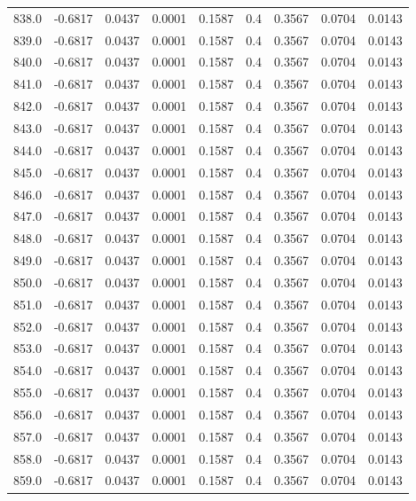 \begin{longtable}{lrrrrrrrr}
838.0 & -0.6817 & 0.0437 & 0.0001 & 0.1587 & 0.4 & 0.3567 & 0.0704 & 0.0143 \\
839.0 & -0.6817 & 0.0437 & 0.0001 & 0.1587 & 0.4 & 0.3567 & 0.0704 & 0.0143 \\
840.0 & -0.6817 & 0.0437 & 0.0001 & 0.1587 & 0.4 & 0.3567 & 0.0704 & 0.0143 \\
841.0 & -0.6817 & 0.0437 & 0.0001 & 0.1587 & 0.4 & 0.3567 & 0.0704 & 0.0143 \\
842.0 & -0.6817 & 0.0437 & 0.0001 & 0.1587 & 0.4 & 0.3567 & 0.0704 & 0.0143 \\
843.0 & -0.6817 & 0.0437 & 0.0001 & 0.1587 & 0.4 & 0.3567 & 0.0704 & 0.0143 \\
844.0 & -0.6817 & 0.0437 & 0.0001 & 0.1587 & 0.4 & 0.3567 & 0.0704 & 0.0143 \\
845.0 & -0.6817 & 0.0437 & 0.0001 & 0.1587 & 0.4 & 0.3567 & 0.0704 & 0.0143 \\
846.0 & -0.6817 & 0.0437 & 0.0001 & 0.1587 & 0.4 & 0.3567 & 0.0704 & 0.0143 \\
847.0 & -0.6817 & 0.0437 & 0.0001 & 0.1587 & 0.4 & 0.3567 & 0.0704 & 0.0143 \\
848.0 & -0.6817 & 0.0437 & 0.0001 & 0.1587 & 0.4 & 0.3567 & 0.0704 & 0.0143 \\
849.0 & -0.6817 & 0.0437 & 0.0001 & 0.1587 & 0.4 & 0.3567 & 0.0704 & 0.0143 \\
850.0 & -0.6817 & 0.0437 & 0.0001 & 0.1587 & 0.4 & 0.3567 & 0.0704 & 0.0143 \\
851.0 & -0.6817 & 0.0437 & 0.0001 & 0.1587 & 0.4 & 0.3567 & 0.0704 & 0.0143 \\
852.0 & -0.6817 & 0.0437 & 0.0001 & 0.1587 & 0.4 & 0.3567 & 0.0704 & 0.0143 \\
853.0 & -0.6817 & 0.0437 & 0.0001 & 0.1587 & 0.4 & 0.3567 & 0.0704 & 0.0143 \\
854.0 & -0.6817 & 0.0437 & 0.0001 & 0.1587 & 0.4 & 0.3567 & 0.0704 & 0.0143 \\
855.0 & -0.6817 & 0.0437 & 0.0001 & 0.1587 & 0.4 & 0.3567 & 0.0704 & 0.0143 \\
856.0 & -0.6817 & 0.0437 & 0.0001 & 0.1587 & 0.4 & 0.3567 & 0.0704 & 0.0143 \\
857.0 & -0.6817 & 0.0437 & 0.0001 & 0.1587 & 0.4 & 0.3567 & 0.0704 & 0.0143 \\
858.0 & -0.6817 & 0.0437 & 0.0001 & 0.1587 & 0.4 & 0.3567 & 0.0704 & 0.0143 \\
859.0 & -0.6817 & 0.0437 & 0.0001 & 0.1587 & 0.4 & 0.3567 & 0.0704 & 0.0143 \\

\end{longtable}
